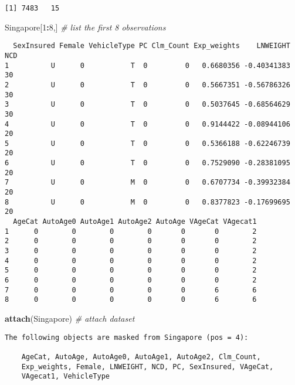 \documentclass[]{book}
\newenvironment{Shaded}{\begin{snugshade}}{\end{snugshade}}
\newcommand{\KeywordTok}[1]{\textcolor[rgb]{0.13,0.29,0.53}{\textbf{#1}}}
\newcommand{\DecValTok}[1]{\textcolor[rgb]{0.00,0.00,0.81}{#1}}
\newcommand{\CommentTok}[1]{\textcolor[rgb]{0.56,0.35,0.01}{\textit{#1}}}
\newcommand{\OperatorTok}[1]{\textcolor[rgb]{0.81,0.36,0.00}{\textbf{#1}}}
\newcommand{\NormalTok}[1]{#1}
\theoremstyle{definition}
\theoremstyle{definition}
\theoremstyle{definition}
\theoremstyle{remark}
\begin{document}
\begin{verbatim}
[1] 7483   15
\end{verbatim}

\begin{Shaded}
\begin{Highlighting}[]
\NormalTok{Singapore[}\DecValTok{1}\OperatorTok{:}\DecValTok{8}\NormalTok{,]  }\CommentTok{# list the first 8 observations}
\end{Highlighting}
\end{Shaded}

\begin{verbatim}
  SexInsured Female VehicleType PC Clm_Count Exp_weights    LNWEIGHT NCD
1          U      0           T  0         0   0.6680356 -0.40341383  30
2          U      0           T  0         0   0.5667351 -0.56786326  30
3          U      0           T  0         0   0.5037645 -0.68564629  30
4          U      0           T  0         0   0.9144422 -0.08944106  20
5          U      0           T  0         0   0.5366188 -0.62246739  20
6          U      0           T  0         0   0.7529090 -0.28381095  20
7          U      0           M  0         0   0.6707734 -0.39932384  20
8          U      0           M  0         0   0.8377823 -0.17699695  20
  AgeCat AutoAge0 AutoAge1 AutoAge2 AutoAge VAgeCat VAgecat1
1      0        0        0        0       0       0        2
2      0        0        0        0       0       0        2
3      0        0        0        0       0       0        2
4      0        0        0        0       0       0        2
5      0        0        0        0       0       0        2
6      0        0        0        0       0       0        2
7      0        0        0        0       0       6        6
8      0        0        0        0       0       6        6
\end{verbatim}

\begin{Shaded}
\begin{Highlighting}[]
\KeywordTok{attach}\NormalTok{(Singapore)  }\CommentTok{# attach dataset}
\end{Highlighting}
\end{Shaded}

\begin{verbatim}
The following objects are masked from Singapore (pos = 4):

    AgeCat, AutoAge, AutoAge0, AutoAge1, AutoAge2, Clm_Count,
    Exp_weights, Female, LNWEIGHT, NCD, PC, SexInsured, VAgeCat,
    VAgecat1, VehicleType
\end{verbatim}
\end{document}
